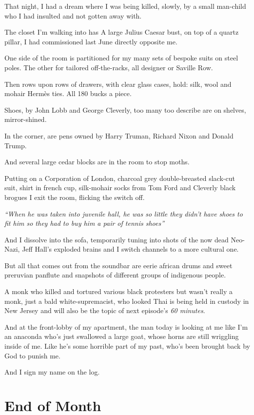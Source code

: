 \documentclass[19pt,openany]{book}
\begin{document}
That night, I had a dream
where I was being killed,
slowly, by a small man-child
who I had insulted and not gotten
away with.

The closet I'm walking into has
A large Julius Caesar bust, on top
of a quartz pillar, I had
commissioned last June  directly opposite
me.

One side of the room is partitioned
for my many sets of bespoke suits
on steel poles. The
other for tailored off-the-racks, all
designer or Saville Row.

Then rows upon rows of drawers,
with clear glass cases, hold:
silk, wool and mohair Hermès ties.
All 180 bucks a piece.

Shoes, by John Lobb and
George Cleverly, too many too describe
are on shelves, mirror-shined.

In the corner, are pens
owned by Harry Truman, Richard
Nixon and Donald Trump.

And several large cedar blocks are
in the room to stop moths.

Putting on a Corporation
of London, charcoal grey
double-breasted slack-cut
suit, shirt in french
cup, silk-mohair
socks from Tom Ford and
Cleverly black brogues I
exit the room, flicking
the switch off.


\textit{``When he was taken
into juvenile hall,
he was so little they
didn't have shoes
to fit him
so they had to buy him a pair
of tennis shoes''}

And I dissolve into the sofa,
temporarily tuning into shots of the
now dead Neo-Nazi, Jeff Hall's
exploded brains and I switch
channels to a more cultural one.

But all that comes out from the soundbar
are eerie african drums and sweet preruvian panflute
and snapshots of different groups of indigenous
people.

A monk who killed and tortured various black protesters
but wasn't really a monk, just a bald
white-supremacist, who looked Thai
is being held in custody in New Jersey
and will also be the topic of next episode's
\textit{60 minutes}.

And at the front-lobby
of my apartment, the
man today is looking at me
like I'm an anaconda who's
just swallowed a large goat,
whose horns are still wriggling
inside of me. Like he's
some horrible part of my past,
who's been brought back
by God to punish me.

And I sign my name on the log.
\chapter{End of Month}
\end{document}
